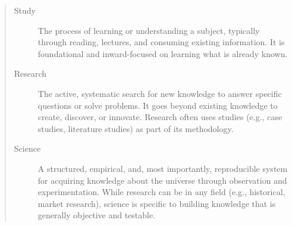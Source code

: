 
{
	\renewcommand{\abstractname}{Reminder}
	\begin{abstract}
			\begin{description}
			\item[Study] The process of learning or understanding a subject, typically through reading, lectures, and consuming existing information. It is foundational and inward-focused on learning what is already known.
			\item[Research]  The active, systematic search for new knowledge to answer specific questions or solve problems. It goes beyond existing knowledge to create, discover, or innovate. Research often uses studies (e.g., case studies, literature studies) as part of its methodology.
			\item[Science] A structured, empirical, and, most importantly, reproducible system for acquiring knowledge about the universe through observation and experimentation. While research can be in any field (e.g., historical, market research), science is specific to building knowledge that is generally objective and testable. 
		\end{description}
	\end{abstract}
}
